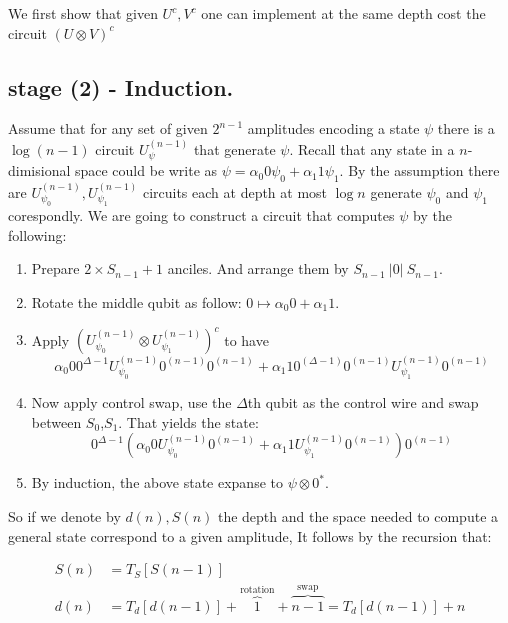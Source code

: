 \documentclass[manuscript,screen,review]{acmart}
\begin{document}
We first show that given $U^{c},V^{c}$ one can implement at the same depth cost the circuit $(U\otimes V)^{c}$

\subsection{stage (2) - Induction.}

Assume that for any set of given $2^{n-1}$ amplitudes encoding a state $\psi$ there is a $\log(n-1)$ circuit $U_{\psi}^{(n-1)}$ that generate $\psi$. Recall that any state in a $n$-dimisional space could be write as $\psi = \alpha_{0} 0 \psi_{0} + \alpha_{1} 1 \psi_{1} $. By the assumption there are $U_{\psi_{0}}^{(n-1)},U_{\psi_{1}}^{(n-1)}$ circuits each at depth at most $\log n$ generate $\psi_{0}$ and $\psi_{1}$ corespondly. We are going to construct a circuit that computes $\psi$ by the following: 
\begin{enumerate}
  \item Prepare $2 \times S_{n-1} + 1$ anciles. And arrange them by $S_{n-1} \ |0| \ S_{n-1}$. 
  \item Rotate the middle qubit as follow: $ 0 \mapsto \alpha_{0} 0 + \alpha_{1} 1 $.   
  \item Apply $\left(U_{\psi_{0}}^{(n-1)} \otimes U_{\psi_{1}}^{(n-1)}\right)^{c} $ to have 
    \begin{equation*}
      \alpha_{0} 0 0^{\Delta -1} U_{\psi_{0}}^{(n-1)} 0^{(n-1)} 0^{(n-1)} + \alpha_{1} 1 0^{(\Delta - 1)}0^{(n-1)}U_{\psi_{1}}^{(n-1)}0^{(n-1)}
    \end{equation*}
  \item Now apply control swap, use the $\Delta$th qubit as the control wire and swap between $S_{0}$,$S_{1}$. That yields the state: 
    \begin{equation*} 0^{\Delta -1} \left(\alpha_{0} 0 U_{\psi_{0}}^{(n-1)} 0^{(n-1)} + \alpha_{1} 1 U_{\psi_{1}}^{(n-1)}0^{(n-1)} \right)0^{(n-1)} 
    \end{equation*}
\item By induction, the above state expanse to $\psi \otimes 0^{*}$.
\end{enumerate}
So if we denote by $d(n), S(n)$ the depth and the space needed to compute a general state correspond to a given amplitude, It follows by the recursion that: 

\begin{equation*}
\begin{split} 
S(n) &= T_{S}[S(n-1)]    \\
d(n) &= T_{d}[d(n-1)] + \overbrace{1}^{ \text{rotation} } + \overbrace{n-1}^{\text{swap}} =  T_{d}[d(n-1)] + n  
\end{split} 
\end{equation*}
\end{document}
